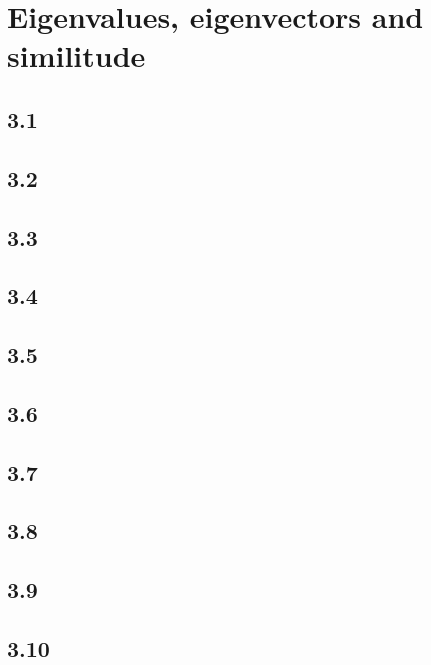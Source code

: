 \section{Eigenvalues, eigenvectors and similitude}
\subsection*{3.1}
\nosolution

\subsection*{3.2}
\nosolution

\subsection*{3.3}
\nosolution

\subsection*{3.4}
\nosolution

\subsection*{3.5}
\nosolution

\subsection*{3.6}
\nosolution

\subsection*{3.7}
\nosolution

\subsection*{3.8}
\nosolution

\subsection*{3.9}
\nosolution

\subsection*{3.10}
\nosolution
